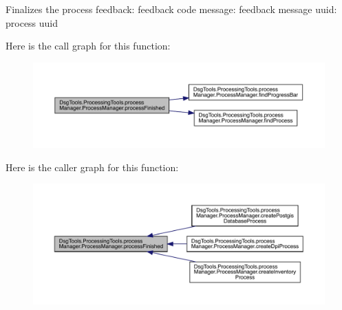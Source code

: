 \begin{DoxyVerb}Finalizes the process
feedback: feedback code
message: feedback message
uuid: process uuid
\end{DoxyVerb}
 Here is the call graph for this function\+:
\nopagebreak
\begin{figure}[H]
\begin{center}
\leavevmode
\includegraphics[width=350pt]{class_dsg_tools_1_1_processing_tools_1_1process_manager_1_1_process_manager_a3054cb26b2103882257b1d2008bec546_cgraph}
\end{center}
\end{figure}
Here is the caller graph for this function\+:
\nopagebreak
\begin{figure}[H]
\begin{center}
\leavevmode
\includegraphics[width=350pt]{class_dsg_tools_1_1_processing_tools_1_1process_manager_1_1_process_manager_a3054cb26b2103882257b1d2008bec546_icgraph}
\end{center}
\end{figure}
\mbox{\label{class_dsg_tools_1_1_processing_tools_1_1process_manager_1_1_process_manager_a6b891be03fdd827eff9a157038560cd2}} 
